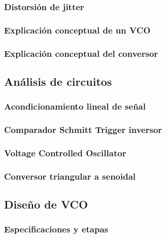\subsubsection{Distorsi\'on de jitter}

\subsubsection{Explicaci\'on conceptual de un VCO}

\subsubsection{Explicaci\'on conceptual del conversor}

\subsection{An\'alisis de circuitos}

\subsubsection{Acondicionamiento lineal de se\~nal}

\subsubsection{Comparador Schmitt Trigger inversor}

\subsubsection{Voltage Controlled Oscillator}

\subsubsection{Conversor triangular a senoidal}

\subsection{Dise\~no de VCO}

\subsubsection{Especificaciones y etapas}

